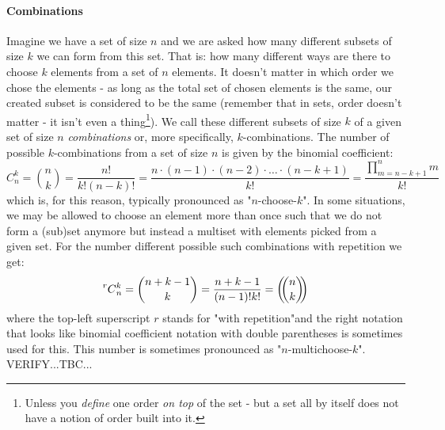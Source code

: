 
\paragraph{Combinations}
Imagine we have a set of size $n$ and we are asked how many different subsets of size $k$ we can form from this set. That is: how many different ways are there to choose $k$ elements from a set of $n$ elements. It doesn't matter in which order we chose the elements - as long as the total set of chosen elements is the same, our created subset is considered to be the same (remember that in sets, order doesn't matter - it isn't even a thing\footnote{Unless you \emph{define} one order \emph{on top} of the set - but a set all by itself does not have a notion of order built into it.}). We call these different subsets of size $k$ of a given set of size $n$ \emph{combinations} or, more specifically, $k$-combinations. The number of possible $k$-combinations from a set of size $n$ is given by the binomial coefficient:
\begin{equation}
C_n^k = \binom{n}{k} 
      = \frac{n!}{k! (n-k)!} 
      = \frac{n \cdot (n-1) \cdot (n-2) \cdot \ldots \cdot (n-k+1)}{k!}
      = \frac{\prod_{m=n-k+1}^{n} m}{k!}
\end{equation}
which is, for this reason, typically pronounced as "$n$-choose-$k$". In some situations, we may be allowed to choose an element more than once such that we do not form a (sub)set anymore but instead a multiset with elements picked from a given set. For the number different possible such combinations with repetition we get:
\begin{equation}
\prescript{r}{}{C}_n^k
= \binom{n+k-1}{k}
= \frac{n+k-1}{(n-1)! k!}
= \left(\!\!{n\choose k}\!\!\right)
\end{equation}
where the top-left superscript $r$ stands for "with repetition"and the right notation that looks like binomial coefficient notation with double parentheses is sometimes used for this. This number is sometimes pronounced as "$n$-multichoose-$k$". VERIFY...TBC...




